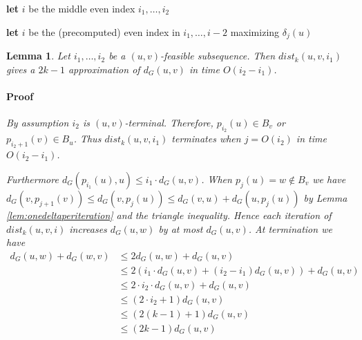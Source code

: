 \documentclass[12pt]{article}
\newtheorem{lem}[thm]{Lemma}
\begin{document}
\begin{Walgo}[ht]{20pt}
  \DontPrintSemicolon
  \Indm
    \Indp
    \BlankLine
    
    \textbf{let} $i$ be the middle even index $i_1,\hdots,i_2$
    
    \textbf{let} $i$ be the (precomputed) even index in $i_1,\hdots,i-2$ maximizing $\delta_j(u)$
    
    \caption{$bdist_k(u,v,i_1,i_2)$}
    \label{alg:bdistk}
\end{Walgo}

\begin{lem}
Let $i_1, \hdots, i_2$ be a $(u,v)$-feasible subsequence. Then $dist_k(u,v,i_1)$ gives a $2k-1$ approximation of $d_G(u,v)$ in time $O(i_2-i_1)$.
\paragraph{Proof} By assumption $i_2$ is $(u,v)$-terminal. Therefore, $p_{i_2}(u) \in B_v$ or $p_{i_2 + 1}(v) \in B_u$. Thus $dist_k(u,v,i_1)$ terminates when $j=O(i_2)$ in time $O(i_2-i_1)$.

Furthermore $d_{G}(p_{i_1}(u),u) \leq i_1 \cdot d_G(u,v)$. When $p_j(u) = w \not\in B_v$
we have $d_G(v,p_{j+1}(v)) \leq d_G(v,p_{j}(u)) \leq d_G(v,u) + d_G(u,p_j(u))$ by Lemma \ref{lem:onedeltaperiteration} and the triangle inequality. Hence each iteration of $dist_k(u,v,i)$ increases $d_G(u,w)$ by at most $d_G(u,v)$. At termination we have
\begin{align*}
d_G(u,w) + d_G(w,v) &\leq 2d_G(u,w) + d_G(u,v) \\
&\leq 2(i_1 \cdot d_G(u,v) + (i_2 - i_1)d_G(u,v)) + d_G(u,v) \\
&\leq 2 \cdot i_2 \cdot d_G(u,v) + d_G(u,v) \\
&\leq (2 \cdot i_2 + 1)d_G(u,v) \\
&\leq (2 (k-1) + 1)d_G(u,v) \\
&\leq (2k-1) d_G(u,v)
\end{align*}
\end{lem}

\end{document}
